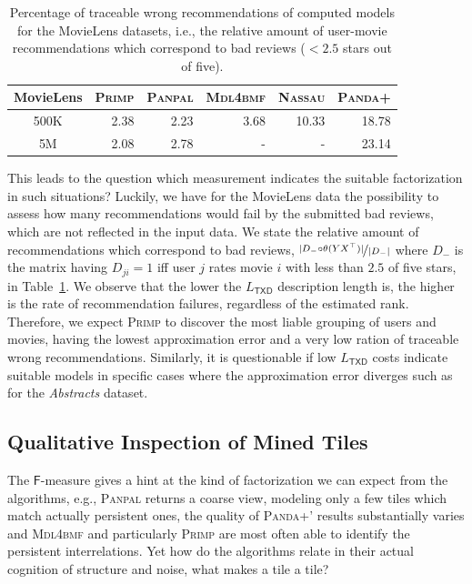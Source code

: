 \begin{table}%
	\centering
	\begin{tabular}{crrrrr}\toprule
    MovieLens & \textsc{Primp} & \textsc{Panpal} & \textsc{Mdl4bmf} & \textsc{Nassau} & \textsc{Panda+}\\ 
    \midrule
    500K & 2.38 & 2.23 &3.68 & 10.33 & 18.78\\
    5M   & 2.08 & 2.78 &-&-&23.14\\
    \bottomrule
    \end{tabular}
    \caption{Percentage of traceable wrong recommendations of computed models for the MovieLens datasets, i.e., the relative amount of user-movie recommendations which correspond to bad reviews ($<2.5$ stars out of five).}
    \label{tbl:FP}
\end{table}

This leads to the question which measurement indicates the suitable factorization in such situations? Luckily, we have for the MovieLens data the possibility to assess how many recommendations would fail by the submitted bad reviews, which are not reflected in the input data. We state the relative amount of recommendations which correspond to bad reviews, $\nicefrac{|D_-\circ \theta(YX^\top )|}{|D_-|}$ where $D_-$ is the matrix having $D_{ji}=1$ iff user $j$ rates movie $i$ with less than $2.5$ of five stars, in Table~\ref{tbl:FP}. We observe that the lower the $L_\mathsf{TXD}$ description length is, the higher is the rate of recommendation failures, regardless of the estimated rank.  Therefore, we expect \textsc{Primp} to discover the most liable grouping of users and movies, having the lowest approximation error and a very low ration of traceable wrong recommendations. Similarly, it is questionable if low $L_\mathsf{TXD}$ costs indicate suitable models in specific cases where the approximation error diverges such as for the \textit{Abstracts} dataset.
\subsection{Qualitative Inspection of Mined Tiles}\label{sec:MDL:qualitativeExp} 
The $\mathsf{F}$-measure gives a hint at the kind of factorization we can expect from the algorithms, e.g., \textsc{Panpal} returns a coarse view, modeling only a few tiles which match actually persistent ones, the quality of \textsc{Panda+}' results substantially varies and \textsc{Mdl4bmf} and particularly \textsc{Primp} are most often able to identify the persistent interrelations. Yet how do the algorithms relate in their actual cognition of structure and noise, what makes a tile a tile?

